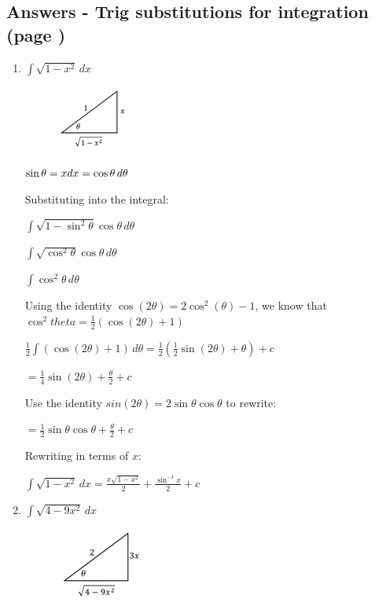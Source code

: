 \documentclass[../main.tex]{subfiles}
\begin{document}
\subsection*{Answers - Trig substitutions for integration (page \pageref{Trig substitution})}
\begin{enumerate}
    \item 
    \(\int \sqrt{1-x^2}\,dx\)
    \begin{figure}[h]
        \includegraphics{images/trigsuba1.png}
    \end{figure}

    \(\sin{\theta}=x\\
    dx=\cos{\theta}\, d\theta\)
    
    Substituting into the integral:

    \(\int \sqrt{1-\sin^2{\theta}}\cos{\theta}\,d\theta\)

    \(\int \sqrt{\cos^2{\theta}}\cos{\theta}\,d\theta\)

    \(\int \cos^2{\theta} \,d\theta\)

    Using the identity \(\cos{(2\theta)}=2\cos^2{(\theta)}-1\), we know that \(\cos^2{theta}=\frac{1}{2}(\cos{(2\theta)}+1)\)

    \(\frac{1}{2}\int (\cos{(2\theta)}+1)\,d\theta=\frac{1}{2}(\frac{1}{2}\sin{(2\theta)}+\theta)+c\)

    \(=\frac{1}{4}\sin{(2\theta)}+\frac{\theta}{2}+c\)

    Use the identity \(sin{(2\theta)}=2\sin{\theta}\cos{\theta}\) to rewrite:

    \(=\frac{1}{2}\sin{\theta}\cos{\theta}+\frac{\theta}{2}+c\)

    Rewriting in terms of \(x\):

    \(\int \sqrt{1-x^2}\,dx=\frac{x\sqrt{1-x^2}}{2}+\frac{\sin^{-1}{x}}{2}+c\)

    \item 
    \(\int \sqrt{4-9x^2}\,dx\)
    \begin{figure}[h]
        \includegraphics{images/trigsuba2.png}
    \end{figure}


\end{enumerate}
\end{document}
